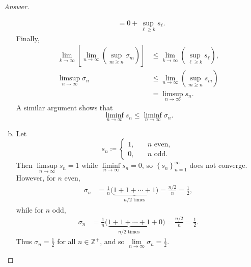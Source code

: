 \documentclass[12pt]{article}
\newcommand{\z}{\mathbb{Z}}
\newcommand\paren[1]{\left( #1 \right)}
\newcommand\setb[1]{\left \{ #1 \right \}}
\newcommand{\sqbrack}[1]{\left [ #1 \right ]}
\theoremstyle{definition}
\begin{document}
\begin{proof}[Answer]
\begin{enumerate}[(a)]
\begin{align*}
            & = 0 + \sup\limits_{\ell \geq k} s_{\ell}.
        \end{align*}
        Finally, 
        \begin{align*}
            \lim\limits_{k \to \infty} \sqbrack{ \lim\limits_{n \to \infty} \paren{ \sup\limits_{m \geq n} \sigma_m } } & \leq \lim\limits_{k \to \infty} \paren{ \sup\limits_{\ell \geq k} s_{\ell} } , \\
            \limsup\limits_{n \to \infty} \sigma_n & \leq \lim\limits_{n \to \infty} \paren{ \sup\limits_{m \geq n} s_{m} } \\
            & = \limsup\limits_{n \to \infty} s_n.
        \end{align*}
        A similar argument shows that 
        \[
            \liminf\limits_{n \to \infty} s_n \leq \liminf\limits_{n \to \infty} \sigma_n.
        \]
        \item Let 
        \[
            s_n \coloneqq 
            \begin{cases}
                1 , & \quad n \text{ even, } \\
                0 , & \quad n \text{ odd. }
            \end{cases}
        \]
        Then $\limsup\limits_{n \to \infty} s_n = 1$ while $\liminf\limits_{n \to \infty} s_n = 0$, so $\setb{ s_n }_{n=1}^{\infty}$ does not converge. However, for $n$ even,
        \begin{align*}
            \sigma_n & = \frac{1}{n} \big( \underbrace{ 1 + 1 + \dotsb + 1 }_{ \text{$n/2$ times} } \big) = \frac{n/2}{n} = \frac{1}{2},
        \end{align*}
        while for $n$ odd,
        \begin{align*}
            \sigma_n & = \frac{1}{n} \big( \underbrace{ 1 + 1 + \dotsb + 1 }_{ \text{$n/2$ times} }  + 0 \big) = \frac{n/2}{n} = \frac{1}{2}.
        \end{align*}
        Thus $\sigma_n = \frac{1}{2}$ for all $n \in \z^+$, and so $\lim\limits_{n \to \infty} \sigma_n = \frac{1}{2}$.
    \end{enumerate}
\end{proof}
\end{document}
